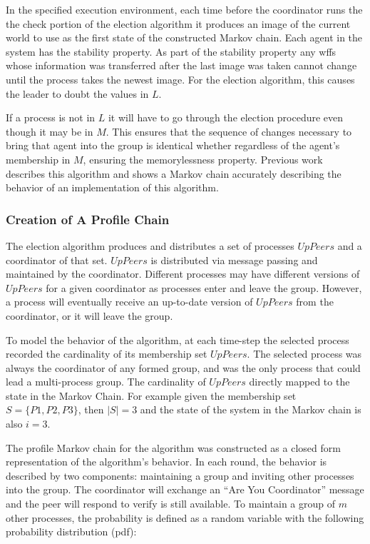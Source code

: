 In the specified execution environment, each time before the coordinator runs the the check portion of the election algorithm it produces an image of the current world to use as the first state of the constructed Markov chain. Each agent in the system has the stability property. As part of the stability property any wffs whose information was transferred after the last image was taken cannot change until the process takes the newest image. For the election algorithm, this causes the leader to doubt the values in $L$.

If a process is not in $L$ it will have to go through the election procedure even though it may be in $M$. This ensures that the sequence of changes necessary to bring that agent into the group is identical whether regardless of the agent's membership in $M$, ensuring the memorylessness property. Previous work \cite{JOURNAL} describes this algorithm and shows a Markov chain accurately describing the behavior of an implementation of this algorithm.

\subsubsection{Creation of A Profile Chain}

The election algorithm produces and distributes a set of processes $UpPeers$ and a coordinator of that set.
$UpPeers$ is distributed via message passing and maintained by the coordinator.
Different processes may have different versions of $UpPeers$ for a given coordinator as processes enter and leave the group.
However, a process will eventually receive an up-to-date version of $UpPeers$ from the coordinator, or it will leave the group.

To model the behavior of the algorithm, at each time-step the selected process recorded the cardinality of its membership set $UpPeers$.
The selected process was always the coordinator of any formed group, and was the only process that could lead a multi-process group.
The cardinality of $UpPeers$ directly mapped to the state in the Markov Chain.
For example given the membership set $S=\{P1,P2,P3\}$, then $\left | S \right |=3$ and the state of the system in the Markov chain is also $i=3$.

The profile Markov chain for the algorithm was constructed as a closed form representation of the algorithm's behavior.
In each round, the behavior is described by two components: maintaining a group and inviting other processes into the group.
The coordinator will exchange an ``Are You Coordinator'' message and the peer will respond to verify is still available.
To maintain a group of $m$ other processes, the probability is defined as a random variable with the following probability distribution (pdf):

